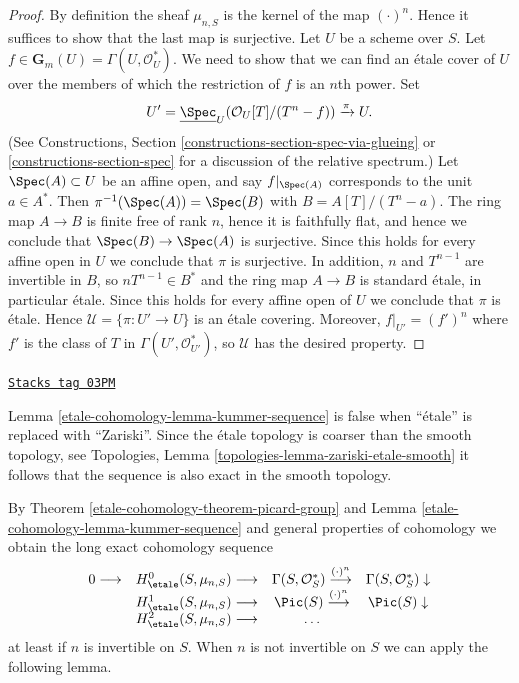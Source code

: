 \begin{proof}
By definition the sheaf $\mu_{n, S}$ is the kernel of the map
$(\cdot)^n$. Hence it suffices to show that the last map is surjective.
Let $U$ be a scheme over $S$. Let
$f \in \mathbf{G}_m(U) = \Gamma(U, \mathcal{O}_U^*)$.
We need to show that we can find an \'etale cover of
$U$ over the members of which the restriction of $f$ is an $n$th power.
Set
$$
U' =
\underline{\Spec}_U(\mathcal{O}_U[T]/(T^n-f))
\xrightarrow{\pi}
U.
$$
(See
Constructions, Section \ref{constructions-section-spec-via-glueing} or
\ref{constructions-section-spec}
for a discussion of the relative spectrum.)
Let $\Spec(A) \subset U$ be an affine open, and say $f|_{\Spec(A)}$ corresponds
to the unit $a \in A^*$. Then $\pi^{-1}(\Spec(A)) = \Spec(B)$ with
$B = A[T]/(T^n - a)$. The ring map $A \to B$ is finite free of rank $n$,
hence it is faithfully flat, and hence we conclude that
$\Spec(B) \to \Spec(A)$ is surjective. Since this holds for every
affine open in $U$ we conclude that $\pi$ is surjective.
In addition, $n$ and $T^{n - 1}$ are invertible in $B$, so
$nT^{n-1} \in B^*$ and the ring map $A \to B$ is standard \'etale,
in particular \'etale. Since this holds for every affine open of $U$
we conclude that $\pi$ is \'etale. Hence
$\mathcal{U} = \{\pi : U' \to U\}$ is an \'etale covering.
Moreover, $f|_{U'} = (f')^n$ where $f'$ is the class of $T$
in $\Gamma(U', \mathcal{O}_{U'}^*)$, so $\mathcal{U}$ has the desired property.
\end{proof}

\begin{remark}
\label{etale-cohomology-remark-no-kummer-sequence-zariski}
\href{https://stacks.math.columbia.edu/tag/03PM}{\texttt{Stacks tag 03PM}}

Lemma \ref{etale-cohomology-lemma-kummer-sequence} is false when ``\'etale'' is replaced
with ``Zariski''.
Since the \'etale topology is coarser than the smooth topology, see
Topologies, Lemma \ref{topologies-lemma-zariski-etale-smooth}
it follows that the sequence is also exact in the smooth topology.
\end{remark}

By
Theorem \ref{etale-cohomology-theorem-picard-group}
and
Lemma \ref{etale-cohomology-lemma-kummer-sequence}
and general properties of cohomology we obtain
the long exact cohomology sequence
$$
\begin{array}{cccc}0 \longrightarrow & H_\etale^0(S, \mu_{n, S}) \longrightarrow & \Gamma(S, \mathcal{O}_S^*) \overset{(\cdot)^n}{\longrightarrow} & \Gamma(S, \mathcal{O}_S^*) \downarrow \\  & H_\etale^1(S, \mu_{n, S}) \longrightarrow & \Pic(S) \overset{(\cdot)^n}{\longrightarrow} & \Pic(S) \downarrow \\  & H_\etale^2(S, \mu_{n, S}) \longrightarrow & \ldots & \end{array}
$$
at least if $n$ is invertible on $S$. When $n$ is not invertible on $S$
we can apply the following lemma.


